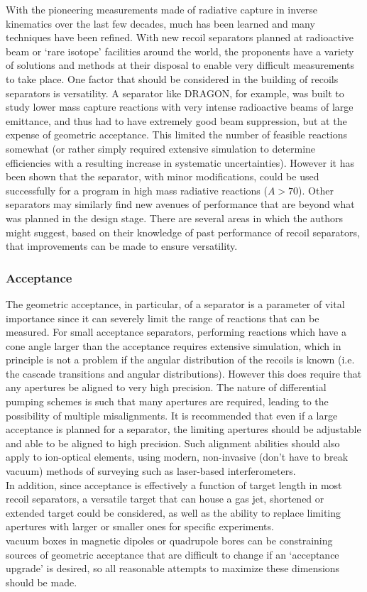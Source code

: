 With the pioneering measurements made of radiative capture in inverse kinematics over the last few decades, much has been learned and many techniques have been refined. With new recoil separators planned at radioactive beam or `rare isotope' facilities around the world, the proponents have a variety of solutions and methods at their disposal to enable very difficult measurements to take place. One factor that should be considered in the building of recoils separators is versatility. A separator like DRAGON, for example, was built to study lower mass capture reactions with very intense radioactive beams of large emittance, and thus had to have extremely good beam suppression, but at the expense of geometric acceptance. This limited the number of feasible reactions somewhat (or rather simply required extensive simulation to determine efficiencies with a resulting increase in systematic uncertainties). However it has been shown that the separator, with minor modifications, could be used successfully for a program in high mass radiative reactions ($A>70$). Other separators may similarly find new avenues of performance that are beyond what was planned in the design stage. There are several areas in which the authors might suggest, based on their knowledge of past performance of recoil separators, that improvements can be made to ensure versatility.

\subsubsection{Acceptance}

The geometric acceptance, in particular, of a separator is a parameter of vital importance since it can severely limit the range of reactions that can be measured. For small acceptance separators, performing reactions which have a cone angle larger than the acceptance requires extensive simulation, which in principle is not a problem if the angular distribution of the recoils is known (i.e. the cascade transitions and angular distributions). However this does require that any apertures be aligned to very high precision. The nature of differential pumping schemes is such that many apertures are required, leading to the possibility of multiple misalignments. It is recommended that even if a large acceptance is planned for a separator, the limiting apertures should be adjustable and able to be aligned to high precision. Such alignment abilities should also apply to ion-optical elements, using modern, non-invasive (don't have to break vacuum) methods of surveying such as laser-based interferometers.\\
In addition, since acceptance is effectively a function of target length in most recoil separators, a versatile target that can house a gas jet, shortened or extended target could be considered, as well as the ability to replace limiting apertures with larger or smaller ones for specific experiments. \\
vacuum boxes in magnetic dipoles or quadrupole bores can be constraining sources of geometric acceptance that are difficult to change if an `acceptance upgrade' is desired, so all reasonable attempts to maximize these dimensions should be made.

